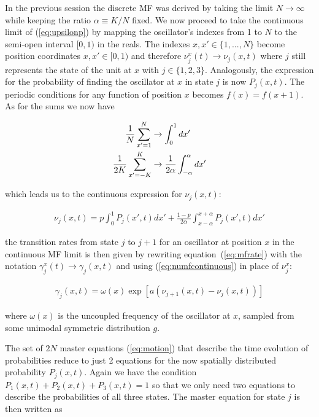 In the previous session the discrete MF was derived by taking the limit $N\to\infty$ while keeping the ratio $\alpha\equiv K/N$ fixed.
We now proceed to take the continuous limit of (\ref{eq:upsilonp}) by mapping the oscillator's indexes from 1 to $N$ to the semi-open
interval $[0,1)$ in the reals. The indexes $x,x' \in \{1,...,N\}$ become position coordinates $x,x'\in [0,1)$ and therefore $\nu^x_j(t)
\to \nu_j(x,t)$ where $j$ still represents the state of the unit at $x$ with $j\in\{1,2,3\}$. Analogously, the expression for the
probability of finding the oscillator at $x$ in state $j$ is now $P_j(x,t)$. The periodic conditions for any function of position $x$
becomes $f(x)=f(x+1)$. As for the sums we now have

\begin{align}
  \frac{1}{N}\sum_{x'=1}^N &\to \int_{0}^{1} dx' \notag\\
  \frac{1}{2K}\sum_{x'=-K}^K &\to \frac{1}{2\alpha}\int_{-\alpha}^{\alpha} dx'
\end{align}

\noindent which leads us to the continuous expression for $\nu_j(x,t)$:

\begin{align}
  \nu_j(x,t) = p \int_0^1 P_j(x',t)dx' + \frac{1-p}{2\alpha}\int_{x-\alpha}^{x+\alpha} P_j(x',t)dx'
  \label{eq:numfcontinuous}
\end{align}

\noindent the transition rates from state $j$ to $j+1$ for an oscillator at position $x$ in the continuous MF limit is then given by
rewriting equation~(\ref{eq:mfrate}) with the notation $\gamma^x_j(t) \to \gamma_j(x,t)$ and using (\ref{eq:numfcontinuous}) in place
of $\nu^x_j$:

\begin{align}
  \gamma_j(x,t) = \omega(x) \exp\left[ a\left( \nu_{j+1}(x,t) - \nu_j(x,t) \right) \right]
  \label{eq:ratecontinuous}
\end{align}

\noindent where $\omega(x)$ is the uncoupled frequency of the oscillator at $x$, sampled from some unimodal symmetric distribution $g$.

The set of $2N$ master equations (\ref{eq:motion}) that describe the time evolution of probabilities reduce to just 2 equations for the
now spatially distributed probability $P_j(x,t)$. Again we have the condition $P_1(x,t) + P_2(x,t) + P_3(x,t)=1$ so that we only need
two equations to describe the probabilities of all three states. The master equation for state $j$ is then written as

